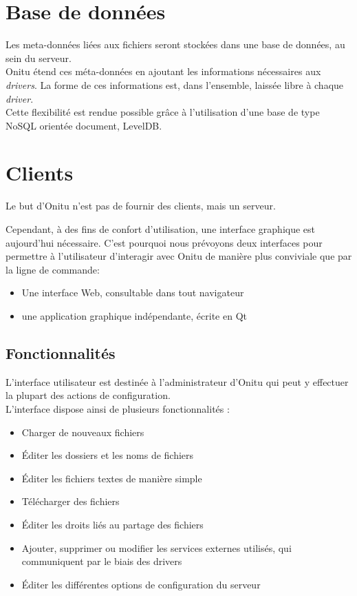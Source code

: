 \section{Base de données}
Les meta-données liées aux fichiers seront stockées dans une base de données, au sein du serveur.\\

Onitu étend ces méta-données en ajoutant les informations nécessaires aux \textit{drivers}. La forme de ces informations est, dans l'ensemble, laissée libre à chaque \textit{driver}.\\

Cette flexibilité est rendue possible grâce à l'utilisation d'une base de type NoSQL orientée document, LevelDB.

\section{Clients}

Le but d'Onitu n'est pas de fournir des clients, mais un serveur.

Cependant, à des fins de confort d'utilisation, une interface graphique est aujourd'hui nécessaire. C'est pourquoi nous prévoyons deux interfaces pour permettre à l'utilisateur d'interagir avec Onitu de manière plus conviviale que par la ligne de commande:

\begin{itemize}
	\item Une interface Web, consultable dans tout navigateur
	\item une application graphique indépendante, écrite en Qt
\end{itemize}

\subsection{Fonctionnalités}

L'interface utilisateur est destinée à l'administrateur d'Onitu qui peut y effectuer la plupart des actions de configuration.\\

L'interface dispose ainsi de plusieurs fonctionnalités :
\begin{itemize}
\renewcommand{\labelitemi}{$\bullet$}
    \item Charger de nouveaux fichiers
    \item Éditer les dossiers et les noms de fichiers
    \item Éditer les fichiers textes de manière simple
    \item Télécharger des fichiers
    \item Éditer les droits liés au partage des fichiers
    \item Ajouter, supprimer ou modifier les services externes utilisés, qui communiquent par le biais des drivers
    \item Éditer les différentes options de configuration du serveur
\end{itemize}
